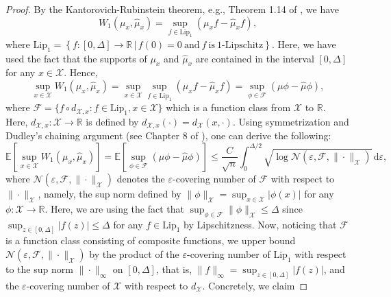 \documentclass[11pt,letterpaper]{article}
\theoremstyle{definition}
\numberwithin{equation}{section}
\newcommand{\cF}{\mathcal{F}}
\newcommand{\cN}{\mathcal{N}}
\newcommand{\cX}{\mathcal{X}}
\newcommand{\R}{\mathbb{R}}
\newcommand{\E}{\mathbb{E}} %
\renewcommand{\epsilon}{\varepsilon}
\begin{document}
\begin{proof}
    By the Kantorovich-Rubinstein theorem, e.g., Theorem 1.14 of \cite{villani_2003}, we have 
    \begin{equation*}
        W_1(\mu_x, \hat{\mu}_x) = \sup_{f \in \mathrm{Lip}_1} \left(\mu_x f - \hat{\mu}_x f\right),
    \end{equation*}
    where $\mathrm{Lip}_1 = \left\{f \colon [0, \Delta] \to \R \, | \, f(0) = 0 ~ \text{and} ~ f ~ \text{is} ~ 1\text{-Lipschitz}\right\}$. Here, we have used the fact that the supports of $\mu_x$ and $\hat{\mu}_x$ are contained in the interval $[0, \Delta]$ for any $x \in \cX$. Hence, 
    \begin{equation*}
        \sup_{x \in \cX} W_1(\mu_x, \hat{\mu}_x) = \sup_{x \in \cX} \sup_{f \in \mathrm{Lip}_1} \left(\mu_x f - \hat{\mu}_x f\right) = \sup_{\phi \in \cF} \left(\mu \phi - \hat{\mu} \phi\right),
    \end{equation*}
    where $\cF = \{f \circ d_{\cX, x} : f \in \mathrm{Lip}_1, x \in \cX\}$ which is a function class from $\cX$ to $\R$. Here, $d_{\cX, x} \colon \cX \to \R$ is defined by $d_{\cX, x}(\cdot) = d_\cX(x, \cdot)$. Using symmetrization and Dudley's chaining argument (see Chapter 8 of \cite{vershynin_2018}), one can derive the following:
    \begin{equation}
        \label{eq:chaining_bound}
        \E\left[\sup_{x \in \cX} W_1(\mu_x, \hat{\mu}_x)\right] = \E\left[\sup_{\phi \in \cF} \left(\mu \phi - \hat{\mu} \phi\right)\right] \le \frac{C}{\sqrt{n}} \int_{0}^{\Delta / 2} \sqrt{\log \cN(\epsilon, \cF, \|\cdot\|_\cX)} \, \mathrm{d} \epsilon,
    \end{equation}
    where $\cN(\epsilon, \cF, \|\cdot\|_\cX)$ denotes the $\epsilon$-covering number of $\cF$ with respect to $\|\cdot\|_\cX$, namely, the sup norm defined by $\|\phi\|_\cX = \sup_{x \in \cX} |\phi(x)|$ for any $\phi \colon \cX \to \R$. Here, we are using the fact that $\sup_{\phi \in \cF} \|\phi\|_\cX \le \Delta$ since $\sup_{z \in [0, \Delta]} |f(z)| \le \Delta$ for any $f \in \mathrm{Lip}_1$ by Lipschitzness. Now, noticing that $\cF$ is a function class consisting of composite functions, we upper bound $\cN(\epsilon, \cF, \|\cdot\|_\cX)$ by the product of the $\epsilon$-covering number of $\mathrm{Lip}_1$ with respect to the sup norm $\|\cdot\|_\infty$ on $[0, \Delta]$, that is, $\|f\|_\infty = \sup_{z \in [0, \Delta]} |f(z)|$, and the $\epsilon$-covering number of $\cX$ with respect to $d_\cX$. Concretely, we claim

\end{proof}
\end{document}
